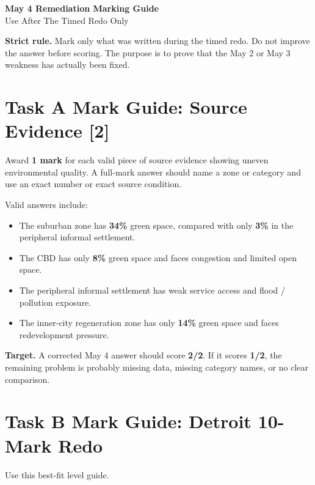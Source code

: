 \documentclass[11pt,a4paper]{article}
\newcommand{\term}[1]{\textcolor{HeadingBlue}{\textbf{#1}}}
\newcommand{\score}[1]{\textcolor{AccentTeal}{\textbf{#1}}}
\newcommand{\boxnote}[3]{%
\noindent\colorbox{#1}{%
  \begin{minipage}{0.965\textwidth}
  \sffamily
  \textbf{\textcolor{HeadingBlue}{#2}} #3
  \end{minipage}
}}
\begin{document}
\begin{center}
  {\sffamily\bfseries\color{HeadingBlue}\LARGE May 4 Remediation Marking Guide}\\[0.25em]
  {\sffamily\color{AccentTeal}\large Use After The Timed Redo Only}
\end{center}

\boxnote{SoftRed}{Strict rule.}{Mark only what was written during the timed
redo. Do not improve the answer before scoring. The purpose is to prove that
the May 2 or May 3 weakness has actually been fixed.}

\section{Task A Mark Guide: Source Evidence [2]}

Award \score{1 mark} for each valid piece of source evidence showing uneven
environmental quality. A full-mark answer should name a zone or category and
use an exact number or exact source condition.

Valid answers include:

\begin{itemize}
  \item The suburban zone has \term{34\%} green space, compared with only
  \term{3\%} in the peripheral informal settlement.
  \item The CBD has only \term{8\%} green space and faces congestion and
  limited open space.
  \item The peripheral informal settlement has weak service access and flood /
  pollution exposure.
  \item The inner-city regeneration zone has only \term{14\%} green space and
  faces redevelopment pressure.
\end{itemize}

\boxnote{SoftGreen}{Target.}{A corrected May 4 answer should score
\score{2/2}. If it scores \score{1/2}, the remaining problem is probably
missing data, missing category names, or no clear comparison.}

\section{Task B Mark Guide: Detroit 10-Mark Redo}

Use this best-fit level guide.
\end{document}
